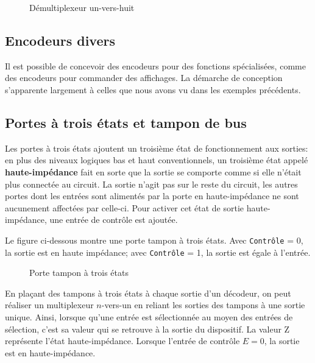 \documentclass[11pt]{article}
\begin{document}
\begin{figure}[htbp]
\centering

\caption{\label{fig:org2939328}Démultiplexeur un-vers-huit}
\end{figure}

\subsection{Encodeurs divers}
\label{sec:orgfc90a08}

Il est possible de concevoir des encodeurs pour des fonctions
spécialisées, comme des encodeurs pour commander des affichages. La
démarche de conception s'apparente largement à celles que nous avons
vu dans les exemples précédents.


\subsection{Portes à trois états et tampon de bus}
\label{sec:org7628472}

Les portes à trois états ajoutent un troisième état de fonctionnement
aux sorties: en plus des niveaux logiques bas et haut conventionnels,
un troisième état appelé \textbf{haute-impédance} fait en sorte que la sortie
se comporte comme si elle n'était plus connectée au circuit. La sortie
n'agit pas sur le reste du circuit, les autres portes dont les entrées
sont alimentés par la porte en haute-impédance ne sont aucunement
affectées par celle-ci. Pour activer cet état de sortie
haute-impédance, une entrée de contrôle est ajoutée.


Le figure ci-dessous montre une porte tampon à trois états. Avec
\texttt{Contrôle} = 0, la sortie est en haute impédance; avec  \texttt{Contrôle} = 1,
la sortie est égale à l'entrée.

\begin{figure}[htbp]
\centering

\caption{\label{fig:org9116013}Porte tampon à trois états}
\end{figure}

En plaçant des tampons à trois états à chaque sortie d'un décodeur, on
peut réaliser un multiplexeur \(n\)-vers-un en reliant les sorties des
tampons à une sortie unique. Ainsi, lorsque qu'une entrée est
sélectionnée au moyen des entrées de sélection, c'est sa valeur qui se
retrouve à la sortie du dispositif. La valeur Z représente l'état
haute-impédance.  Lorsque l'entrée de contrôle \(E = 0\), la sortie est
en haute-impédance.
\end{document}
